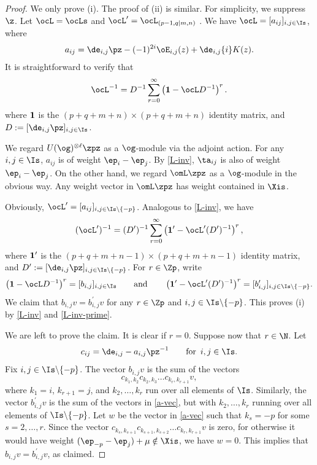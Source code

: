 \documentclass[11pt, reqno]{amsart}
\theoremstyle{definition}
\theoremstyle{remark}
\numberwithin{equation}{section}
\begin{document}
\begin{proof}

We only prove (i). The proof of (ii) is similar. 
For simplicity, we suppress $\z$.
Let $\ocL=\ocLs$ and $\ocL^\prime=\ocL_{(p-1,q|m,n)}$ .
We have $\ocL=[a_{ij}]_{i,j \in \Is}$, where
$$
a_{ij}=\de_{i,j}\pz-(-1)^{2i} \oE_{i,j}(z) +\de_{i,j}\{i\} K(z).
$$
It is straightforward to verify that
\begin{equation} \label{L-inv}
\ocL^{-1}=D^{-1} \sum_{r=0}^\infty \left( {\bf 1}   -\ocL D^{-1} \right)^r.
\end{equation}
where $\bf 1$ is the $(p+q+m+n) \times (p+q+m+n)$ identity matrix, and $D:=[\de_{i,j}\pz]_{i,j \in \Is}$.

We regard $U(\og)^{\otimes \ell} \zpz$ as a $\og$-module via the adjoint action.
For any $i, j \in \Is$, $a_{ij}$ is of weight $\ep_i-\ep_j$.
By \eqref{L-inv}, $\ta_{ij}$ is also of weight $\ep_i-\ep_j$.
On the other hand, we regard $\omL \zpz$ as a $\og$-module in the obvious way.
Any weight vector in $\omL \zpz$ has weight contained in $\Xis$.

Obviously, $\ocL^\prime=[a_{ij}]_{i,j \in \Is\backslash\{-p\}}$.
Analogous to \eqref{L-inv}, we have
\begin{equation} \label{L-inv-prime}
(\ocL^\prime)^{-1}= (D^\prime)^{-1} \sum_{r=0}^\infty \left( {\bf 1}^\prime   -\ocL^\prime (D^\prime)^{-1} \right)^r,
\end{equation}
where $\bf 1^\prime$ is the $(p+q+m+n-1) \times (p+q+m+n-1)$ identity matrix, and $D^\prime:=[\de_{i,j}\pz]_{i,j \in  \Is\backslash\{-p\}}$. 
%
For $r \in \Zp$, write
$$
\left( {\bf 1}   -\ocL D^{-1} \right)^r=[b_{i,j}]_{i,j \in \Is} \qquad \text{and} \qquad \left( {\bf 1}^\prime   -\ocL^\prime (D^\prime)^{-1} \right)^r=[b^\prime_{i,j}]_{i,j \in \Is\backslash\{-p\}}.
$$
We claim that $b_{i,j} v=b^\prime_{i,j} v$ for any $r \in \Zp$ and $i,j \in \Is\backslash\{-p\}$. 
This proves (i) by \eqref{L-inv} and \eqref{L-inv-prime}.

We are left to prove the claim.
It is clear if $r=0$. 
Suppose now that $r \in \N$.
Let
$$
c_{ij}=\de_{i,j}-a_{i,j} \pz^{-1} \qquad \mbox{for $\, i,j \in \Is$}.
$$
Fix $i,j \in \Is\backslash\{-p\}$. The vector $b_{i,j} v$ is the sum of the vectors
\begin{equation} \label{a-vec}
c_{k_1,k_2} c_{k_2,k_3} \ldots c_{k_r,k_{r+1}}v,
\end{equation}
where $k_1=i$, $k_{r+1}=j$, and $k_2, \ldots, k_r$ run over all elements of $\Is$.
Similarly, the vector $b^\prime_{i,j} v$ is the sum of the vectors in \eqref{a-vec}, but with $k_2, \ldots, k_r$ running over all elements of $\Is\backslash\{-p\}$.
%
Let $w$ be the vector in \eqref{a-vec} such that $k_s=-p$ for some $s=2, \ldots, r$.
Since the vector $c_{k_s,k_{s+1}} c_{k_{s+1},k_{s+2}} \ldots c_{k_r,k_{r+1}}v$ is zero, for otherwise it would have weight $(\ep_{-p}-\ep_j)+\mu\notin\Xis$,
we have $w=0$.
This implies that $b_{i,j} v=b^\prime_{i,j} v$, as claimed.
\end{proof}
\end{document}
